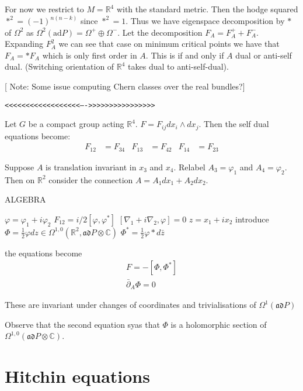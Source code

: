 For now we restrict to $ M = \mathbb{R}  ^4 $ with the standard metric. 
Then the hodge squared $ * ^2 = ( -1) ^{n(n-k) } $ since $ * ^2 = 1$. 
Thus we have eigenspace decomposition by $*$ of $\Omega^2 $ as $\Omega^2(\mathrm{ad}P) = \Omega^+ \oplus \Omega^- $. 
Let the decomposition $ F_A = F_A ^+ + F_A ^- $.
Expanding $F_A ^2 $ we can see that case on minimum critical points we have that $ F_A = * F_A$
which is only first order in $A$. 
This is if and only if $A$ dual or anti-self dual.
(Switching orientation of $\mathbb{R} ^4$ takes dual to anti-self-dual). 

[ Note: Some issue computing Chern classes over the real bundles?]

\texttt{<<<<<<<<<<<<<<<<<<---->>>>>>>>>>>>>>>>}

Let $G$ be a compact group acting $ \mathbb{R} ^4$. 
$ F = F_{ij} dx_i \wedge dx_j $.
Then the self dual equations become:
\begin{align}
    F_{12} &= F_{34}  & F_{13} &= F_{42}  & F_{14} &= F_{23}  
\end{align}

Suppose $ A $ is translation invariant in $x_3$ and $x_4$.
Relabel $ A_3 = \varphi_1 $ and $A_4 = \varphi_2$.
Then on $ \mathbb{R} ^2 $ consider the connection $ A = A_1 dx_1 + A_2 dx_2 $. 

ALGEBRA

$\varphi = \varphi_1 + i \varphi_2$
$ F_{12} = i/2 [ \varphi , \varphi ^* ] $
$[ \nabla_1 + i \nabla_2 , \varphi ] = 0 $ 
$ z = x_1 + ix_2$ 
introduce 
$ \Phi = \frac{1}{2} \varphi dz \in \Omega^{1,0} ( \mathbb{R} ^2 , \mathfrak{ad}P \otimes \mathbb{C} )$
$\Phi^* = \frac{1}{2} \varphi * d\bar{z}$

the equations become 
\begin{align}
    F = - [ \Phi , \Phi^* ] \\
    \bar{\partial} _A \Phi = 0 
\end{align}

These are invariant under changes of coordinates and trivialisations of $ \Omega^1(\mathfrak{ad} P ) $

Observe that the second equation syas that $\Phi $ is a holomorphic section of $ \Omega^{1,0} ( \mathfrak{ad} P \otimes \mathbb{C}) $.

\section{Hitchin equations} %



